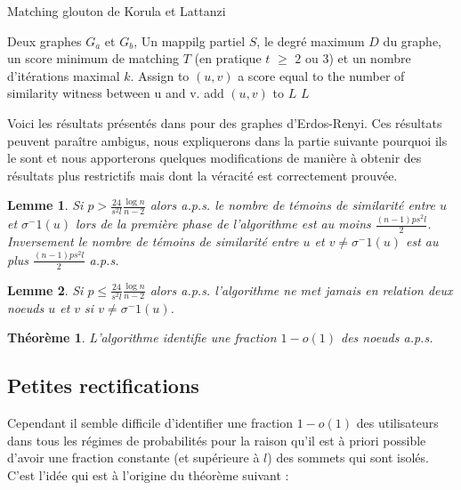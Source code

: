 \documentclass[letterpaper,10pt]{llncs}
\newtheorem{theoreme}{Théorème}
\newtheorem{lemme}{Lemme}
\begin{document}
\begin{algorithm}
\caption{Matching glouton de Korula et Lattanzi}
\begin{algorithmic}
\REQUIRE Deux graphes $G_a$ et $G_b$, Un mappilg partiel $S$, le degré maximum $D$ du graphe, un score minimum de matching $T$ (en pratique $t$ $\geq$ $2$ ou $3$) et un nombre d'itérations maximal $k$.
\STATE Assign to $(u,v)$ a score equal to the number of similarity witness between u and v.
\ENDFOR
{}
\STATE add $(u,v)$ to $L$
\ENDIF
\ENDFOR
\ENDFOR
\RETURN $L$
\end{algorithmic}
\end{algorithm}

Voici les résultats présentés dans \cite{Korula:2014:ERA:2732269.2732274} pour des graphes d'Erdos-Renyi. Ces résultats peuvent paraître ambigus, nous expliquerons dans la partie suivante pourquoi ils le sont et nous apporterons quelques modifications de manière à obtenir des résultats plus restrictifs mais dont la véracité est correctement prouvée.

\begin{lemme}
Si $p > \frac{24}{s^2 l} \frac{\log n}{n-2}$ alors a.p.s. le nombre de témoins de similarité entre $u$ et $\sigma^-1(u)$ lors de la première phase de l'algorithme  est au moins $\frac{(n-1)ps^2l}{2}$. Inversement le nombre de témoins de similarité entre $u$ et $v \neq \sigma^-1(u)$ est au plus  $\frac{(n-1)ps^2l}{2}$ a.p.s.
\end{lemme}

\begin{lemme}
Si $p \leq \frac{24}{s^2 l} \frac{\log n}{n-2}$ alors a.p.s. l'algorithme ne met jamais en relation deux noeuds $u$ et $v$ si  $v \neq \sigma^-1(u)$.
\end{lemme}

\begin{theoreme}
L'algorithme identifie une fraction $1 - o(1)$ des noeuds a.p.s.
\end{theoreme}

\subsection{Petites rectifications}

Cependant il semble difficile d'identifier une fraction $1 - o(1)$ des utilisateurs dans tous les régimes de probabilités pour la raison qu'il est à priori possible d'avoir une fraction constante (et supérieure à $l$) des sommets qui sont isolés. C'est l'idée qui est à l'origine du théorème suivant :
\end{document}
